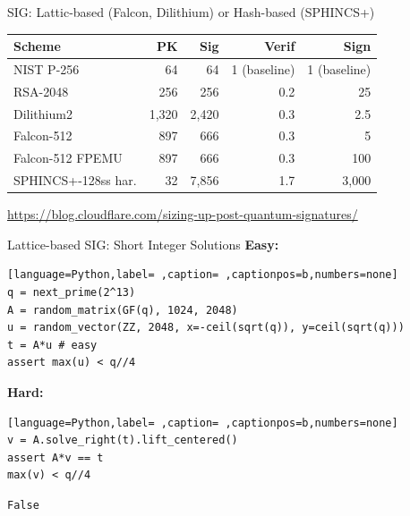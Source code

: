 \documentclass[xcolor=table,10pt,aspectratio=169]{beamer}
\begin{document}
\begin{frame}[label={sec:org91d65f4}]{SIG: Lattic-based (Falcon, Dilithium) or Hash-based (SPHINCS+)}
\begin{center}
\begin{tabular}{lrrrr}
\toprule
Scheme & PK & Sig & Verif & Sign\\[0pt]
\midrule
NIST P-256 & 64 & 64 & 1 (baseline) & 1 (baseline)\\[0pt]
RSA-2048 & 256 & 256 & 0.2 & 25\\[0pt]
\midrule
Dilithium2 & 1,320 & 2,420 & 0.3 & 2.5\\[0pt]
Falcon-512 & 897 & 666 & 0.3 & 5\\[0pt]
Falcon-512 FPEMU & 897 & 666 & 0.3 & 100\\[0pt]
SPHINCS+-128ss har. & 32 & 7,856 & 1.7 & 3,000\\[0pt]
\bottomrule
\end{tabular}

\end{center}

\tiny \url{https://blog.cloudflare.com/sizing-up-post-quantum-signatures/}
\end{frame}

\begin{frame}[label={sec:orgd88c94a},fragile]{Lattice-based SIG: Short Integer Solutions}
 \textbf{Easy:}

\begin{lstlisting}[language=Python,label= ,caption= ,captionpos=b,numbers=none]
q = next_prime(2^13)
A = random_matrix(GF(q), 1024, 2048)
u = random_vector(ZZ, 2048, x=-ceil(sqrt(q)), y=ceil(sqrt(q)))
t = A*u # easy
assert max(u) < q//4 
\end{lstlisting}

\textbf{Hard:}

\begin{lstlisting}[language=Python,label= ,caption= ,captionpos=b,numbers=none]
v = A.solve_right(t).lift_centered()
assert A*v == t
max(v) < q//4
\end{lstlisting}

\begin{verbatim}
False
\end{verbatim}
\end{frame}
\end{document}
